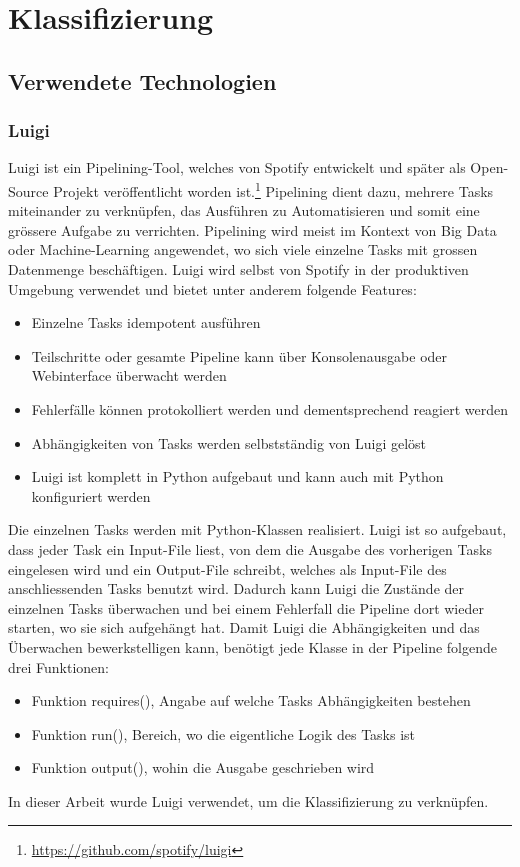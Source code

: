 \section{Klassifizierung}
\subsection{Verwendete Technologien}
\subsubsection{Luigi}
Luigi ist ein Pipelining-Tool, welches von Spotify entwickelt und später als Open-Source Projekt veröffentlicht worden ist.\footnote{\url{https://github.com/spotify/luigi}}
Pipelining dient dazu, mehrere Tasks miteinander zu verknüpfen, das Ausführen zu Automatisieren und somit eine grössere Aufgabe zu verrichten.
Pipelining wird meist im Kontext von Big Data oder Machine-Learning angewendet, wo sich viele einzelne Tasks mit grossen Datenmenge beschäftigen.
Luigi wird selbst von Spotify in der produktiven Umgebung verwendet und bietet unter anderem folgende Features:
\begin{itemize}
	\item Einzelne Tasks idempotent ausführen
	\item Teilschritte oder gesamte Pipeline kann über Konsolenausgabe oder Webinterface überwacht werden
	\item Fehlerfälle können protokolliert werden und dementsprechend reagiert werden
	\item Abhängigkeiten von Tasks werden selbstständig von Luigi gelöst
	\item Luigi ist komplett in Python aufgebaut und kann auch mit Python konfiguriert werden
\end{itemize}
Die einzelnen Tasks werden mit Python-Klassen realisiert.
Luigi ist so aufgebaut, dass jeder Task ein Input-File liest, von dem die Ausgabe des vorherigen Tasks eingelesen wird und ein Output-File schreibt, welches als Input-File des anschliessenden Tasks benutzt wird.
Dadurch kann Luigi die Zustände der einzelnen Tasks überwachen und bei einem Fehlerfall die Pipeline dort wieder starten, wo sie sich aufgehängt hat.
Damit Luigi die Abhängigkeiten und das Überwachen bewerkstelligen kann, benötigt jede Klasse in der Pipeline folgende drei Funktionen:
\begin{itemize}
	\item Funktion requires(), Angabe auf welche Tasks Abhängigkeiten bestehen
	\item Funktion run(), Bereich, wo die eigentliche Logik des Tasks ist
	\item Funktion output(), wohin die Ausgabe geschrieben wird
\end{itemize}
In dieser Arbeit wurde Luigi verwendet, um die Klassifizierung zu verknüpfen.

